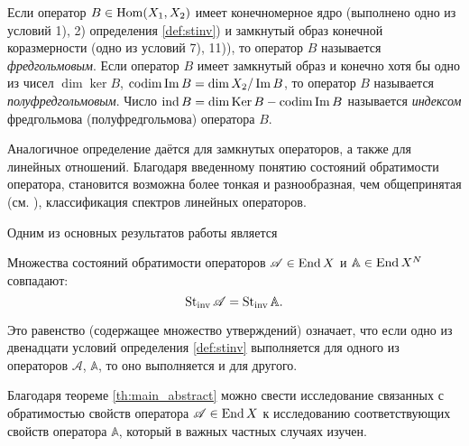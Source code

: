 \begin{definition}
Если оператор $B \in \operatorname{Hom}(X_1, X_2)$ имеет конечномерное ядро (выполнено одно из условий 1), 2) определения \ref{def:stinv}) и замкнутый образ конечной коразмерности (одно из условий 7), 11)), то оператор $B$ называется \emph{фредгольмовым}. Если оператор $B$ имеет замкнутый образ и конечно хотя бы одно из чисел $\dim \ker B$, $\operatorname{codim} \operatorname{Im} B = \dim X_2 / \operatorname{Im} B$, то оператор $B$ называется \emph{полуфредгольмовым}. Число $\operatorname{ind} B = \dim \operatorname{Ker} B - \operatorname{codim} \operatorname{Im} B$ называется \emph{индексом} фредгольмова (полуфредгольмова) оператора $B$.
\end{definition}

Аналогичное определение даётся для замкнутых операторов, а также для линейных отношений.
Благодаря введенному понятию состояний обратимости оператора, становится возможна более тонкая и разнообразная, чем общепринятая (см. \cite{dunford}), классификация спектров линейных операторов.

Одним из основных результатов работы является
\begin{theorem}\label{th:main_abstract}
    Множества состояний обратимости операторов $ \mathcal A \in \operatorname{End}{X}$ и $\mathbb A \in \operatorname{End}{X^{N}}$ совпадают:
    \[ \operatorname{St_{inv}}{\mathcal A} = \operatorname{St_{inv}}{\mathbb A}. \]
\end{theorem}
Это равенство (содержащее множество утверждений) означает, что если одно из двенадцати условий определения \ref{def:stinv} выполняется для одного из операторов $ \mathcal A$, $\mathbb A$, то оно выполняется и для другого.

Благодаря теореме \ref{th:main_abstract} можно свести исследование связанных с обратимостью свойств оператора $\mathcal A \in \operatorname{End}{X}$ к исследованию соответствующих свойств оператора $\mathbb A$, который в важных частных случаях изучен.

